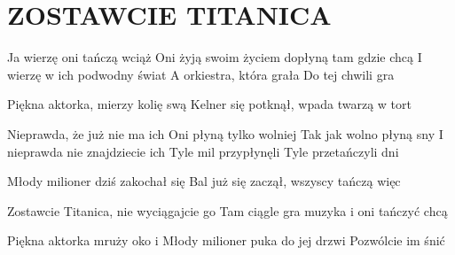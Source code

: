 \documentclass[../../../songbook.tex]{subfiles}
\begin{document}
\TabPositions{8cm} %
\section*{ZOSTAWCIE TITANICA}
{}
\vspace{0.5cm}
Ja wierzę oni tańczą wciąż		 \newline	
Oni żyją swoim życiem			\newline
 dopłyną tam gdzie chcą			\newline
I wierzę w ich podwodny świat 	 \newline
A orkiestra, która grała		 \newline
Do tej chwili gra				 \newline

Piękna aktorka, mierzy kolię swą		 \newline	
Kelner się potknął, wpada twarzą w tort	 \newline	

Nieprawda, że już nie ma ich \newline	
Oni płyną tylko wolniej \newline	
Tak jak wolno płyną sny \newline	
I nieprawda nie znajdziecie ich \newline	
Tyle mil przypłynęli \newline	
Tyle przetańczyli dni \newline	

Młody milioner dziś zakochał się \newline	
Bal już się zaczął, wszyscy tańczą więc \newline	

\-\hspace{1cm} Zostawcie Titanica, nie wyciągajcie go 	 \newline	
\-\hspace{1cm} Tam ciągle gra muzyka i oni tańczyć chcą	 \newline	

Piękna aktorka mruży oko i 	 \newline	
Młody milioner puka do jej drzwi	 \newline	
Pozwólcie im śnić \newline	
\end{document}
